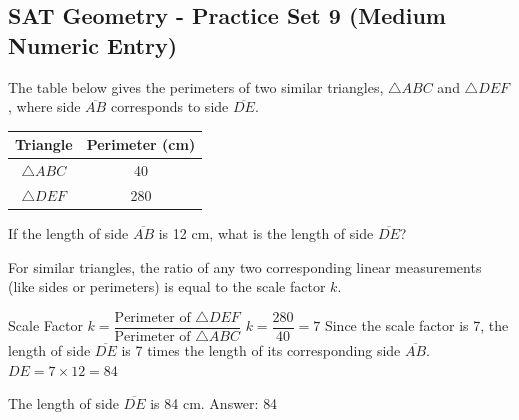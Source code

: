 \documentclass[11pt,paper=a4,answers]{exam}
\begin{document}
\begin{questions}
\pointsinrightmargin
\pointsdroppedatright
\marksnotpoints
{}
\pointformat{\boldmath\themarginpoints}
\bracketedpoints


\section*{SAT Geometry - Practice Set 9 (Medium Numeric Entry)}

\question
The table below gives the perimeters of two similar triangles, $\triangle ABC$ and $\triangle DEF$, where side $\overline{AB}$ corresponds to side $\overline{DE}$. 
\begin{center}
\begin{tabular}{|c|c|}
\hline
\textbf{Triangle} & \textbf{Perimeter (cm)} \\ \hline
$\triangle ABC$ & 40 \\ \hline
$\triangle DEF$ & 280 \\ \hline
\end{tabular}
\end{center}
If the length of side $\overline{AB}$ is 12 cm, what is the length of side $\overline{DE}$?

\begin{solution}
For similar triangles, the ratio of any two corresponding linear measurements (like sides or perimeters) is equal to the scale factor $k$.
\vspace{5pt}
\begin{center}
Scale Factor $k = \dfrac{\text{Perimeter of } \triangle DEF}{\text{Perimeter of } \triangle ABC}$
\vspace{5pt}
$k = \dfrac{280}{40} = 7$
\vspace{5pt}
Since the scale factor is 7, the length of side $\overline{DE}$ is 7 times the length of its corresponding side $\overline{AB}$.
\vspace{5pt}
$DE = 7 \times 12 = 84$
\end{center}
\vspace{5pt}
The length of side $\overline{DE}$ is 84 cm.
\vspace{5pt}
Answer: \colorbox{yellow!100}{84}
\end{solution}

\vspace{1cm}


\end{questions}
\end{document}
